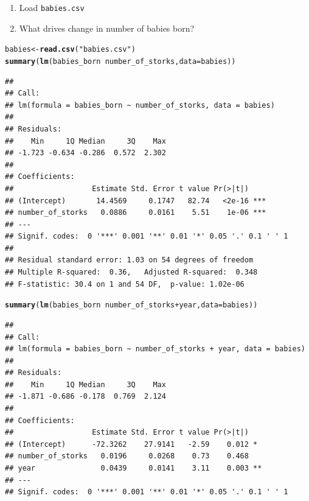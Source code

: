 \documentclass[12pt,a4paper]{scrartcl}\usepackage[]{graphicx}\usepackage[]{color}
\makeatletter
\newcommand{\hlstr}[1]{\textcolor[rgb]{0.192,0.494,0.8}{#1}}%
\newcommand{\hlopt}[1]{\textcolor[rgb]{0,0,0}{#1}}%
\newcommand{\hlstd}[1]{\textcolor[rgb]{0.345,0.345,0.345}{#1}}%
\newcommand{\hlkwb}[1]{\textcolor[rgb]{0.69,0.353,0.396}{#1}}%
\newcommand{\hlkwc}[1]{\textcolor[rgb]{0.333,0.667,0.333}{#1}}%
\newcommand{\hlkwd}[1]{\textcolor[rgb]{0.737,0.353,0.396}{\textbf{#1}}}%
\newenvironment{kframe}{%
 \def\at@end@of@kframe{}%
 \ifinner\ifhmode%
  \def\at@end@of@kframe{\end{minipage}}%
  \begin{minipage}{\columnwidth}%
 \fi\fi%
 \def\FrameCommand##1{\hskip\@totalleftmargin \hskip-\fboxsep
 \colorbox{shadecolor}{##1}\hskip-\fboxsep
     \hskip-\linewidth \hskip-\@totalleftmargin \hskip\columnwidth}%
 \MakeFramed {\advance\hsize-\width
   \@totalleftmargin\z@ \linewidth\hsize
   \@setminipage}}%
 {\par\unskip\endMakeFramed%
 \at@end@of@kframe}
\newenvironment{knitrout}{}{} %
\makeatother
\begin{document}
\begin{Exercise}[difficulty=1, title={Babies}]



    \begin{enumerate}
      \item Load \texttt{babies.csv}
      \item What drives change in number of babies born?
    \end{enumerate}
\end{Exercise}
\begin{Answer}
\begin{knitrout}
\color{fgcolor}\begin{kframe}
\begin{alltt}
  \hlstd{babies} \hlkwb{<-} \hlkwd{read.csv}\hlstd{(}\hlstr{"babies.csv"}\hlstd{)}
  \hlkwd{summary}\hlstd{(}\hlkwd{lm}\hlstd{(babies_born} \hlopt{~} \hlstd{number_of_storks,} \hlkwc{data} \hlstd{= babies))}
\end{alltt}
\begin{verbatim}
## 
## Call:
## lm(formula = babies_born ~ number_of_storks, data = babies)
## 
## Residuals:
##    Min     1Q Median     3Q    Max 
## -1.723 -0.634 -0.286  0.572  2.302 
## 
## Coefficients:
##                  Estimate Std. Error t value Pr(>|t|)    
## (Intercept)       14.4569     0.1747   82.74   <2e-16 ***
## number_of_storks   0.0886     0.0161    5.51    1e-06 ***
## ---
## Signif. codes:  0 '***' 0.001 '**' 0.01 '*' 0.05 '.' 0.1 ' ' 1
## 
## Residual standard error: 1.03 on 54 degrees of freedom
## Multiple R-squared:  0.36,	Adjusted R-squared:  0.348 
## F-statistic: 30.4 on 1 and 54 DF,  p-value: 1.02e-06
\end{verbatim}
\begin{alltt}
  \hlkwd{summary}\hlstd{(}\hlkwd{lm}\hlstd{(babies_born} \hlopt{~} \hlstd{number_of_storks} \hlopt{+} \hlstd{year,} \hlkwc{data} \hlstd{= babies))}
\end{alltt}
\begin{verbatim}
## 
## Call:
## lm(formula = babies_born ~ number_of_storks + year, data = babies)
## 
## Residuals:
##    Min     1Q Median     3Q    Max 
## -1.871 -0.686 -0.178  0.769  2.124 
## 
## Coefficients:
##                  Estimate Std. Error t value Pr(>|t|)   
## (Intercept)      -72.3262    27.9141   -2.59    0.012 * 
## number_of_storks   0.0196     0.0268    0.73    0.468   
## year               0.0439     0.0141    3.11    0.003 **
## ---
## Signif. codes:  0 '***' 0.001 '**' 0.01 '*' 0.05 '.' 0.1 ' ' 1

\end{verbatim}
\end{kframe}
\end{knitrout}
\end{Answer}
\end{document}
